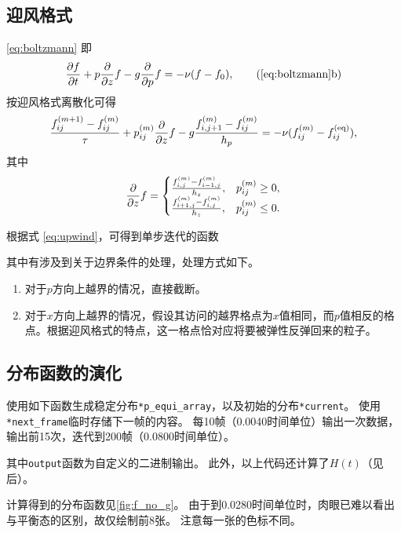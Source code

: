 \documentclass[a4paper,unicode]{report}
\begin{document}
\subsection{迎风格式}
\eqref{eq:boltzmann} 即
\begin{equation}
    \pdv{f}{t} + p\pdv{z} f - g\pdv{p} f = -\nu (f -f_0), \tag{\ref{eq:boltzmann}b}
\end{equation}
按迎风格式离散化可得
\begin{equation}\label{eq:upwind}
    \frac{f_{ij}^{(m+1)} - f_{ij}^{(m)}}{\tau}
    + p_{ij}^{(m)} \pdv{z} f
    - g \frac{f_{i,j+1}^{(m)} - f_{ij}^{(m)}}{h_p}
    = -\nu (f_{ij}^{(m)} - f_{ij}^{(\text{eq})}),
\end{equation}
其中
\begin{equation}
    \pdv{z} f = \begin{cases}
        \frac{f_{i,j}^{(m)} - f_{i-1,j}^{(m)}}{h_z}, & p_{ij}^{(m)} \ge 0,\\
        \frac{f_{i+1,j}^{(m)} - f_{i,j}^{(m)}}{h_z}, & p_{ij}^{(m)} \le 0.
    \end{cases}
\end{equation}

根据式 \eqref{eq:upwind}，可得到单步迭代的函数
{
    \linespread{1.0}
    
    
}

其中有涉及到关于边界条件的处理，处理方式如下。
\begin{enumerate}
    \item 对于$p$方向上越界的情况，直接截断。
    \item 对于$x$方向上越界的情况，假设其访问的越界格点为$x$值相同，而$p$值相反的格点。根据迎风格式的特点，这一格点恰对应将要被弹性反弹回来的粒子。
\end{enumerate}

\subsection{分布函数的演化}
使用如下函数生成稳定分布\verb|*p_equi_array|，以及初始的分布\verb|*current|。
使用\verb|*next_frame|临时存储下一帧的内容。
每10帧（0.0040时间单位）输出一次数据，输出前15次，迭代到200帧（0.0800时间单位）。
{
    \linespread{1.0}
    
}
其中\verb|output|函数为自定义的二进制输出。
此外，以上代码还计算了$H(t)$（见后）。

计算得到的分布函数见\autoref{fig:f_no_g}。
由于到0.0280时间单位时，肉眼已难以看出与平衡态的区别，故仅绘制前8张。
注意每一张的色标不同。
\end{document}
